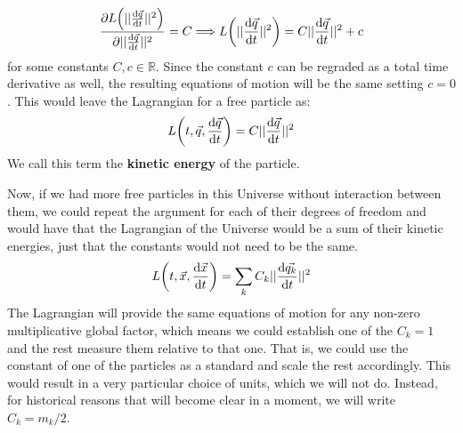 \documentclass[11pt, a4paper]{article} %
\newcommand{\R}{\mathbb{R}} %
\begin{document}
\begin{equation}
\pdv{L\qty(||\dv{\vec{q}}{t}||^2)}{||\dv{\vec{q}}{t}||^2}=C \Longrightarrow L\qty(||\dv{\vec{q}}{t}||^2) = C||\dv{\vec{q}}{t}||^2+c
\end{equation}
for some constants $C,c\in\R$. Since the constant $c$ can be regraded as a total time derivative as well, the resulting equations of motion will be the same setting $c=0$. This would leave the Lagrangian for a free particle as:
\begin{equation}
L\qty(t, \vec{q}, \dv{\vec{q}}{t})=C||\dv{\vec{q}}{t}||^2
\end{equation}
We call this term the {\bf kinetic energy} of the particle.

Now, if we had more free particles in this Universe without interaction between them, we could repeat the argument for each of their degrees of freedom and would have that the Lagrangian of the Universe would be a sum of their kinetic energies, just that the constants would not need to be the same.
\begin{equation}
L\qty(t, \vec{x}, \dv{\vec{x}}{t})=\sum_{k}C_k||\dv{\vec{q_k}}{t}||^2
\end{equation}
The Lagrangian will provide the same equations of motion for any non-zero multiplicative global factor, which means we could establish one of the $C_k=1$ and the rest measure them relative to that one. That is, we could use the constant of one of the particles as a standard and scale the rest accordingly. This would result in a very particular choice of units, which we will not do. Instead, for historical reasons that will become clear in a moment, we will write $C_k=m_k/2$.
\end{document}
